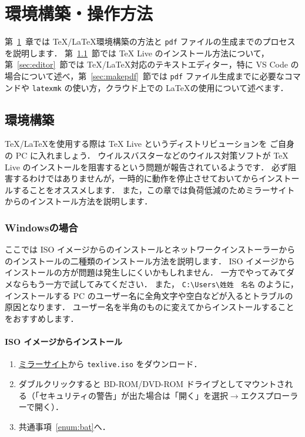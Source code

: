 \chapter{環境構築・操作方法}
\label{ch:howtouse}

第~\ref{ch:howtouse}~章では \TeX/\LaTeX 環境構築の方法と \verb|pdf| ファイルの生成までのプロセスを説明します．
第~\ref{sec:environment}~節では TeX Live のインストール方法について，第~\ref{sec:editor}~節では \TeX/\LaTeX 対応のテキストエディター，特に VS Code の場合について述べ，第~\ref{sec:makepdf}~節では \verb|pdf| ファイル生成までに必要なコマンドや \verb|latexmk| の使い方，クラウド上での \LaTeX の使用について述べます．

\section{環境構築}
\label{sec:environment}

\TeX/\LaTeX を使用する際は TeX Live というディストリビューションを ご自身の PC に入れましょう．
ウイルスバスターなどのウイルス対策ソフトが TeX Live のインストールを阻害するという問題が報告されているようです．
必ず阻害するわけではありませんが，一時的に動作を停止させておいてからインストールすることをオススメします．
また，この章では負荷低減のためミラーサイトからのインストール方法を説明します．

\subsection{Windowsの場合}
\label{ssec:windows}

ここでは ISO イメージからのインストールとネットワークインストーラーからのインストールの二種類のインストール方法を説明します．
ISO イメージからインストールの方が問題は発生しにくいかもしれません．
一方でやってみてダメならもう一方で試してみてください．
また， \verb|C:\Users\姓姓　名名| のように，インストールする PC のユーザー名に全角文字や空白などが入るとトラブルの原因となります．
ユーザー名を半角のものに変えてからインストールすることをおすすめします．

\subsubsection*{ISO イメージからインストール}

\begin{enumerate}
    \item \href{http://mirror.ctan.org/systems/texlive/Images/}{ミラーサイト}から \verb|texlive.iso| をダウンロード．
    \item ダブルクリックすると BD-ROM/DVD-ROM ドライブとしてマウントされる（「セキュリティの警告」が出た場合は「開く」を選択$\to$エクスプローラーで開く）．
    \item 共通事項~\ref{enum:bat}へ．
\end{enumerate}



